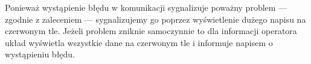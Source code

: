 \begin{figure}[ht]
\centering
{}
\label{R2}
\end{figure}


Ponieważ wystąpienie błędu w komunikacji sygnalizuje poważny problem --- zgodnie z zaleceniem --- sygnalizujemy go poprzez wyświetlenie dużego napisu na czerwonym tle. Jeżeli problem zniknie samoczynnie to dla informacji operatora układ wyświetla wszystkie dane na czerwonym tle i informuje napisem o wystąpieniu błędu.


\begin{figure}[ht]
\centering
{}
\label{R5}
\end{figure}


\begin{figure}[ht]
\centering
{}
\label{R6}
\end{figure}


